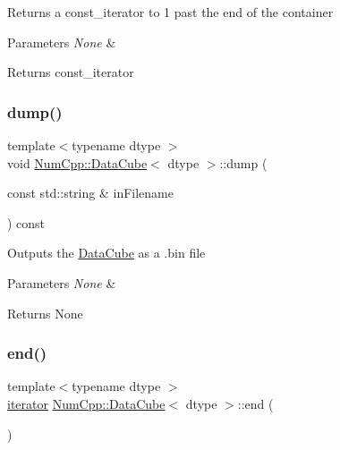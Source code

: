 Returns a const\+\_\+iterator to 1 past the end of the container


\begin{DoxyParams}{Parameters}
{\em None} & \\
\hline
\end{DoxyParams}
\begin{DoxyReturn}{Returns}
const\+\_\+iterator 
\end{DoxyReturn}
\mbox{\label{class_num_cpp_1_1_data_cube_af4f3bcc885d1a0668e202d163d31d1ac}} 
\subsubsection{\texorpdfstring{dump()}{dump()}}
{\footnotesize\ttfamily template$<$typename dtype $>$ \\
void \mbox{\hyperlink{class_num_cpp_1_1_data_cube}{Num\+Cpp\+::\+Data\+Cube}}$<$ dtype $>$\+::dump (\begin{DoxyParamCaption}\item[{const std\+::string \&}]{in\+Filename }\end{DoxyParamCaption}) const\hspace{0.3cm}{\ttfamily [inline]}}

Outputs the \mbox{\hyperlink{class_num_cpp_1_1_data_cube}{Data\+Cube}} as a .bin file


\begin{DoxyParams}{Parameters}
{\em None} & \\
\hline
\end{DoxyParams}
\begin{DoxyReturn}{Returns}
None 
\end{DoxyReturn}
\mbox{\label{class_num_cpp_1_1_data_cube_a8664c89b7134dcc64d9eb0d9c9f3f8c1}} 
\subsubsection{\texorpdfstring{end()}{end()}}
{\footnotesize\ttfamily template$<$typename dtype $>$ \\
\mbox{\hyperlink{class_num_cpp_1_1_data_cube_a817f739957d3d426e8a19a66867674ba}{iterator}} \mbox{\hyperlink{class_num_cpp_1_1_data_cube}{Num\+Cpp\+::\+Data\+Cube}}$<$ dtype $>$\+::end (\begin{DoxyParamCaption}{ }\end{DoxyParamCaption})\hspace{0.3cm}{\ttfamily [inline]}}

